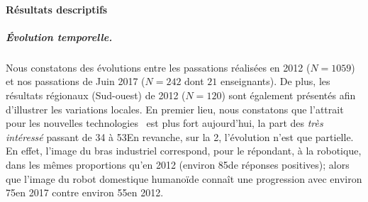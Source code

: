         \paragraph{Résultats descriptifs}
          \subparagraph{Évolution temporelle.}
            Nous constatons des évolutions entre les passations réalisées en 2012 ($N=1059$) et nos passations de Juin 2017 ($N=242$ dont $21$ enseignants).
            De plus, les résultats régionaux (\ie Sud-ouest) de 2012 ($N=120$) sont également présentés afin d'illustrer les variations locales.
            En premier lieu, nous constatons que l'attrait pour les nouvelles technologies~ est plus fort aujourd'hui, la part des \textit{très intéressé} passant de 34 à 53\prc[.]
            En revanche, sur la 2\ieme {}, l'évolution n'est que partielle. 
            En effet, l'image du bras industriel correspond, pour le répondant, à la robotique, dans les mêmes proportions qu'en 2012 (environ 85\prc de réponses positives); alors que l'image du robot domestique humanoïde connaît une progression avec environ 75\prc en 2017 contre environ 55\prc en 2012.
